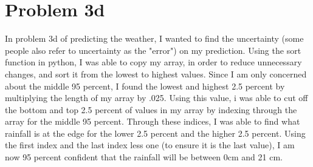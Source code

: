 \documentclass[twocolumn]{revtex4}
\begin{document}
\section{Problem 3d}
	In problem 3d of predicting the weather, I wanted to find the uncertainty (some people also refer to uncertainty as the "error") on my prediction. Using the sort function in python, I was able to copy my array, in order to reduce unnecessary changes, and sort it from the lowest to highest values. Since I am only concerned about the middle 95 percent, I found the lowest and highest 2.5 percent by multiplying the length of my array by .025. Using this value, i was able to cut off the bottom and top 2.5 percent of values in my array by indexing through the array for the middle 95 percent.
	Through these indices, I was able to find what rainfall is at the edge for the lower 2.5 percent and the higher 2.5 percent. Using the first index and the last index less one (to ensure it is the last value), I am now 95 percent confident that the rainfall will be between 0cm and 21 cm. 
\end{document}
